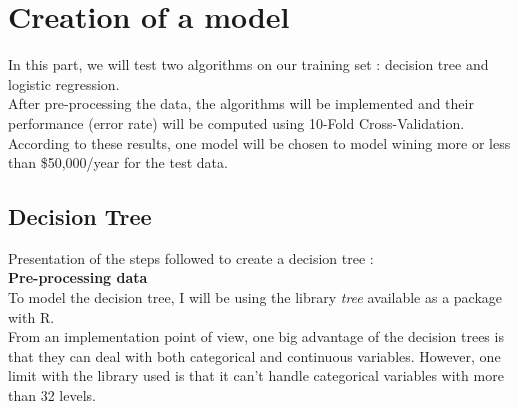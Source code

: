 \documentclass{article}
\begin{document}
\section{Creation of a model}
\noindent In this part, we will test two algorithms on our training set : decision tree and logistic regression.\\ After pre-processing the data, the algorithms will be implemented and their performance (error rate) will be computed using 10-Fold Cross-Validation. According to these results, one model will be chosen to model wining more or less than \$50,000/year for the test data. 
\subsection{Decision Tree}
Presentation of the steps followed to create a decision tree : \\

\noindent\textbf{Pre-processing data} \\

\noindent To model the decision tree, I will be using the library \textit{tree} available as a package with R. \\

\noindent From an implementation point of view, one big advantage of the decision trees is that they can deal with both categorical and continuous variables. However, one limit with the library used is that it can't handle categorical variables with more than 32 levels.\\
\end{document}
